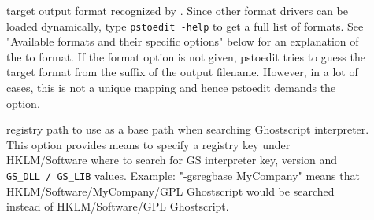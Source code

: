 \documentclass[english,a4paper]{article}
\begin{document}
\begin{description}
\item[]
target output format recognized by . Since other format drivers can be loaded dynamically, type  \texttt{pstoedit -help} to get a full list of formats. See "Available formats and their specific options" below for an explanation of the  to  format. If the format option is not given, pstoedit tries to guess the target format  from the suffix of the output filename. However, in a lot of cases, this is not a unique mapping and hence pstoedit demands the  option.


\item[]
registry path to use as a base path when searching Ghostscript interpreter.
This option provides means to specify a registry key under HKLM/Software where to search for GS interpreter key, version and \verb+GS_DLL / GS_LIB+ values. Example: "-gsregbase MyCompany" means that HKLM/Software/MyCompany/GPL Ghostscript would be searched instead of HKLM/Software/GPL Ghostscript.


\end{description}
\end{document}
